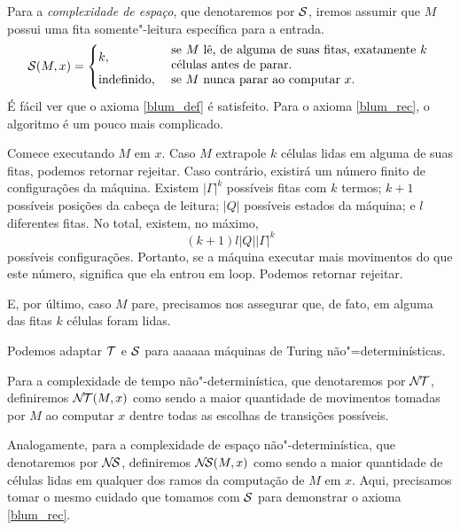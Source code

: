 \begin{example}
    \label{complexidade_espaco}
    Para a \emph{complexidade de espaço},
    que denotaremos por ${\mathcal{S}}$,
    iremos assumir que $M$ possui uma fita somente"-leitura
    específica para a entrada.
    \begin{equation*}
        \PhiDS(M, x) = \begin{cases}
            k, & \text{
                \parbox{0.6\textwidth}{%
                    se $M$ lê, de alguma de suas fitas,
                    exatamente $k$ células
                    antes de parar.
                }
            } \\
            \text{indefinido}, & \text{
                \parbox{0.6\textwidth}{
                    se $M$ nunca parar ao computar $x$.
                }
            }
        \end{cases}
    \end{equation*}
    É fácil ver que o axioma \ref{blum_def} é satisfeito.
    Para o axioma \ref{blum_rec},
    o algoritmo é um pouco mais complicado.

    Comece executando $M$ em $x$.
    Caso $M$ extrapole $k$ células lidas
    em alguma de suas fitas,
    podemos retornar rejeitar.
    Caso contrário,
    existirá um número finito de configurações da máquina.
    Existem $|\Gamma|^k$ possíveis fitas com $k$ termos;
    $k+1$ possíveis posições da cabeça de leitura;
    $|Q|$ possíveis estados da máquina;
    e $l$ diferentes fitas.
    No total, existem, no máximo,
    \begin{equation*}
        (k+1) l |Q||\Gamma|^k
    \end{equation*}
    possíveis configurações.
    Portanto, se a máquina executar
    mais movimentos do que este número,
    significa que ela entrou em loop.
    Podemos retornar rejeitar.

    E, por último,
    caso $M$ pare,
    precisamos nos assegurar que,
    de fato,
    em alguma das fitas $k$ células foram lidas.
\end{example}

\begin{example}
    Podemos adaptar ${\mathcal{T}}$ e ${\mathcal{S}}$
    para aaaaaa máquinas de Turing não"=determinísticas.

    Para a complexidade de tempo não"-determinística,
    que denotaremos por ${\mathcal{N\!T}}$,
    definiremos ${\mathcal{N\!T}}(M, x)$
    como sendo a maior quantidade de movimentos
    tomadas por $M$ ao computar $x$
    dentre todas as escolhas de transições possíveis.

    Analogamente,
    para a complexidade de espaço não"-determinística,
    que denotaremos por ${\mathcal{N\!S}}$,
    definiremos ${\mathcal{N\!S}}(M, x)$
    como sendo a maior quantidade de células lidas
    em qualquer dos ramos da computação de $M$ em $x$.
    Aqui, precisamos tomar o mesmo cuidado que tomamos
    com ${\mathcal{S}}$ para demonstrar o axioma \ref{blum_rec}.
\end{example}

